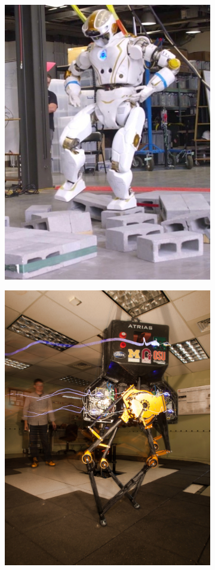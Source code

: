 \begin{figure}[h]
\begin{subfigure}{0.23\textwidth}
  \caption{}
   \label{fig:currentrobotsb}
  \end{subfigure}
  \begin{subfigure}{0.23\textwidth}
    \centering
  \includegraphics[width=.8\linewidth]{STYLESTUFF/Valkyrie.jpeg}
    \caption{}
     \label{fig:currentrobotsc}
  \end{subfigure}
   \begin{subfigure}{0.23\textwidth}
     \centering
  \includegraphics[width=.8\linewidth]{STYLESTUFF/ATRIAS.png}

\end{subfigure}
\end{figure}
